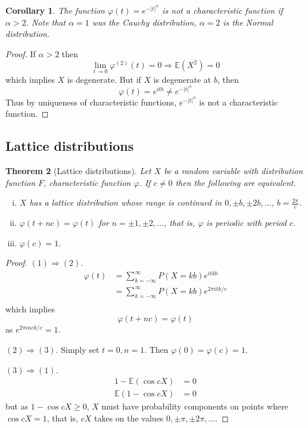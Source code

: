 \documentclass[10pt, oneside, reqno]{amsart}
\theoremstyle{plain}%
\newtheorem{thm}{Theorem}[section]
\newtheorem{cor}[thm]{Corollary}
\theoremstyle{definition}
\theoremstyle{remark}
\renewcommand{\phi}{\varphi}
\newcommand{\E}{\mathbb{E}}
\begin{document}
	\begin{cor}
		The function $\phi(t) = e^{-|t|^\alpha}$ is not a characteristic function if $\alpha > 2$.  Note that $\alpha = 1$ was the Cauchy distribution, $\alpha  = 2$ is the Normal distribution.
	\end{cor}
	
	\begin{proof}
		If $\alpha > 2$ then \[
			\lim_{t \rightarrow 0 } \phi^{(2)}(t) = 0 \Rightarrow \E(X^2) = 0
		\] which implies $X$ is degenerate.  But if $X$ is degenerate at $b$, then \[
			\phi(t) = e^{itb} \neq e^{-|t|^\alpha}
		\]  Thus by uniqueness of characteristic functions, $e^{-|t|^\alpha}$ is not a characteristic function.
	\end{proof}

\subsection{Lattice distributions} %
\label{sub:lattice_distributions}

\begin{thm}[Lattice distributions]
	Let $X$ be a random variable with distribution function $F$, characteristic function $\phi$.  If $c \neq 0$ then the following are equivalent.
	\begin{enumerate}[(i)]
		\item $X$ has a lattice distribution whose range is continued in $0, \pm b, \pm 2b, \dots$, $b = \frac{2 \pi}{c}$.
		\item $\phi(t + nc) = \phi(t)$ for $n = \pm 1, \pm 2, \dots$, that is, $\phi$ is periodic with period $c$. 
		\item $\phi(c) = 1$.  
	\end{enumerate}
\end{thm}
\begin{proof}
	$(1) \Rightarrow (2)$.
	\begin{align*}
		\phi(t) &= \sum_{k=-\infty}^\infty P(X = kb) e^{itkb} \\
		&= \sum_{k=-\infty}^\infty P(X=kb) e^{2\pi i t k /c} \\
	\end{align*} which implies \[
		\phi(t + nc) = \phi(t)
	\] as $e^{2 \pi i n c k /c} = 1$.  
	
	$(2) \Rightarrow (3)$.  Simply set $t = 0, n = 1$.  Then $\phi(0) = \phi(c) = 1$.  
	
	$(3) \Rightarrow (1)$.  \begin{align*}
		1 - \E(\cos cX) &= 0 \\
		\E(1 - \cos cX) &= 0 
	\end{align*}
	but as $1 - \cos cX \geq 0$, $X$ must have probability components on points where $\cos cX = 1$, that is, $c X$ takes on the values $0, \pm \pi, \pm 2 \pi, \dots$.  
\end{proof} 
\end{document}
